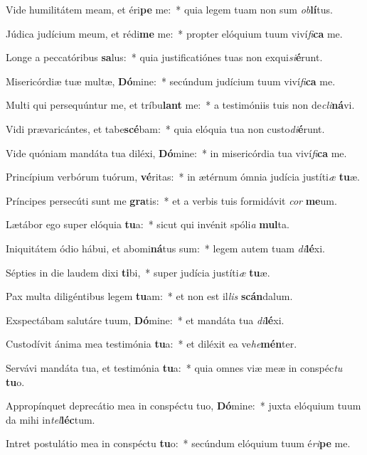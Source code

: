 \item Vide humilitátem meam, et éri\textbf{pe} me:~* quia legem tuam non sum \textit{ob}\textbf{lí}tus.
\item Júdica judícium meum, et rédi\textbf{me} me:~* propter elóquium tuum viví\textit{fi}\textbf{ca} me.
\item Longe a peccatóribus \textbf{sa}lus:~* quia justificatiónes tuas non exqui\textit{si}\textbf{é}runt.
\item Misericórdiæ tuæ multæ, \textbf{Dó}mine:~* secúndum judícium tuum viví\textit{fi}\textbf{ca} me.
\item Multi qui persequúntur me, et tríbu\textbf{lant} me:~* a testimóniis tuis non de\textit{cli}\textbf{ná}vi.
\item Vidi prævaricántes, et tabe\textbf{scé}bam:~* quia elóquia tua non custo\textit{di}\textbf{é}runt.
\item Vide quóniam mandáta tua diléxi, \textbf{Dó}mine:~* in misericórdia tua viví\textit{fi}\textbf{ca} me.
\item Princípium verbórum tuórum, \textbf{vé}ritas:~* in ætérnum ómnia judícia justíti\textit{æ} \textbf{tu}æ.
\item Príncipes persecúti sunt me \textbf{gra}tis:~* et a verbis tuis formidávit \textit{cor} \textbf{me}um.
\item Lætábor ego super elóquia \textbf{tu}a:~* sicut qui invénit spóli\textit{a} \textbf{mul}ta.
\item Iniquitátem ódio hábui, et abomi\textbf{ná}tus sum:~* legem autem tuam \textit{di}\textbf{lé}xi.
\item Sépties in die laudem dixi \textbf{ti}bi,~* super judícia justíti\textit{æ} \textbf{tu}æ.
\item Pax multa diligéntibus legem \textbf{tu}am:~* et non est il\textit{lis} \textbf{scán}dalum.
\item Exspectábam salutáre tuum, \textbf{Dó}mine:~* et mandáta tua \textit{di}\textbf{lé}xi.
\item Custodívit ánima mea testimónia \textbf{tu}a:~* et diléxit ea ve\textit{he}\textbf{mén}ter.
\item Servávi mandáta tua, et testimónia \textbf{tu}a:~* quia omnes viæ meæ in conspéc\textit{tu} \textbf{tu}o.
\item Appropínquet deprecátio mea in conspéctu tuo, \textbf{Dó}mine:~* juxta elóquium tuum da mihi in\textit{tel}\textbf{léc}tum.
\item Intret postulátio mea in conspéctu \textbf{tu}o:~* secúndum elóquium tuum é\textit{ri}\textbf{pe} me.
